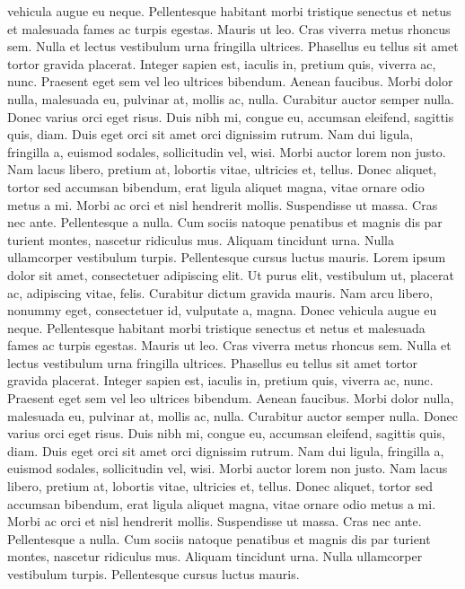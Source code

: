 vehicula augue eu neque. Pellentesque habitant morbi tristique senectus et netus et malesuada fames ac turpis egestas. Mauris ut leo. Cras viverra metus rhoncus sem. Nulla et lectus vestibulum urna fringilla ultrices. Phasellus eu tellus sit amet tortor gravida placerat. Integer sapien est, iaculis in, pretium quis, viverra ac, nunc. Praesent eget sem vel leo ultrices bibendum. Aenean faucibus. Morbi dolor nulla, malesuada eu, pulvinar at, mollis ac, nulla. Curabitur auctor semper nulla. Donec varius orci eget risus. Duis nibh mi, congue eu, accumsan eleifend, sagittis quis, diam. Duis eget orci sit amet orci dignissim rutrum. Nam dui ligula, fringilla a, euismod sodales, sollicitudin vel, wisi. Morbi auctor lorem non justo. Nam lacus libero, pretium at, lobortis vitae, ultricies et, tellus. Donec aliquet, tortor sed accumsan bibendum, erat ligula aliquet magna, vitae ornare odio metus a mi. Morbi ac orci et nisl hendrerit mollis. Suspendisse ut massa. Cras nec ante. Pellentesque a nulla. Cum sociis natoque penatibus et magnis dis par turient montes, nascetur ridiculus mus. Aliquam tincidunt urna. Nulla ullamcorper vestibulum turpis. Pellentesque cursus luctus mauris. Lorem ipsum dolor sit amet, consectetuer adipiscing elit. Ut purus elit, vestibulum ut, placerat ac, adipiscing vitae, felis. Curabitur dictum gravida mauris. Nam arcu libero, nonummy eget, consectetuer id, vulputate a, magna. Donec vehicula augue eu neque. Pellentesque habitant morbi tristique senectus et netus et malesuada fames ac turpis egestas. Mauris ut leo. Cras viverra metus rhoncus sem. Nulla et lectus vestibulum urna fringilla ultrices. Phasellus eu tellus sit amet tortor gravida placerat. Integer sapien est, iaculis in, pretium quis, viverra ac, nunc. Praesent eget sem vel leo ultrices bibendum. Aenean faucibus. Morbi dolor nulla, malesuada eu, pulvinar at, mollis ac, nulla. Curabitur auctor semper nulla. Donec varius orci eget risus. Duis nibh mi, congue eu, accumsan eleifend, sagittis quis, diam. Duis eget orci sit amet orci dignissim rutrum. Nam dui ligula, fringilla a, euismod sodales, sollicitudin vel, wisi. Morbi auctor lorem non justo. Nam lacus libero, pretium at, lobortis vitae, ultricies et, tellus. Donec aliquet, tortor sed accumsan bibendum, erat ligula aliquet magna, vitae ornare odio metus a mi. Morbi ac orci et nisl hendrerit mollis. Suspendisse ut massa. Cras nec ante. Pellentesque a nulla. Cum sociis natoque penatibus et magnis dis par turient montes, nascetur ridiculus mus. Aliquam tincidunt urna. Nulla ullamcorper vestibulum turpis. Pellentesque cursus luctus mauris.

